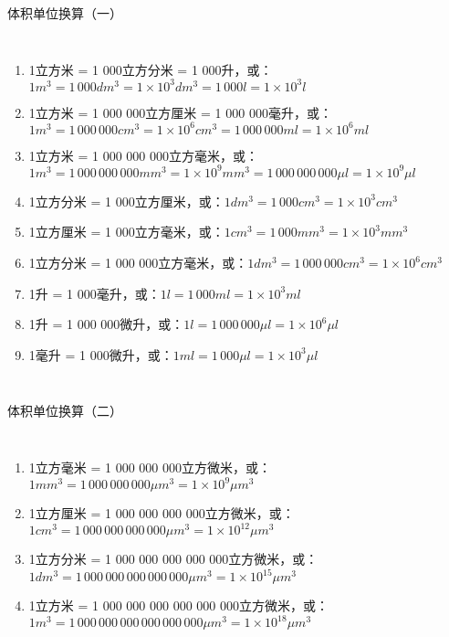 \documentclass[aspectratio=169]{ctexbeamer} %
\begin{document}
\begin{frame}[t]{体积单位换算（一）}
\begin{columns}
\begin{enumerate}[label={\Alph*.}]
\item 1立方米 = 1 000立方分米 = 1 000升，或：$1m^3 = 1 \, 000 dm^3 = 1 \times 10^3 dm^3 = 1 \, 000 l =  1 \times 10^3 l$ \pause
\item 1立方米 = 1 000 000立方厘米 = 1 000 000毫升，或：$1m^3 = 1 \, 000 \, 000 cm^3 = 1 \times 10^6 cm^3 = 1 \, 000 \, 000 ml = 1 \times 10^6 ml$ \pause
\item 1立方米 = 1 000 000 000立方毫米，或：$1m^3 = 1 \, 000 \, 000 \, 000 mm^3 = 1 \times 10^9 mm^3 = 1 \, 000 \, 000 \, 000 \mu l = 1 \times 10^9 \mu l$ \pause
\item 1立方分米 = 1 000立方厘米，或：$1dm^3 = 1 \, 000 cm^3 = 1 \times 10^3 cm^3$ \pause
\item 1立方厘米 = 1 000立方毫米，或：$1cm^3 = 1 \, 000 mm^3 = 1 \times 10^3 mm^3$ \pause
\item 1立方分米 = 1 000 000立方毫米，或：$1dm^3 = 1 \, 000 \, 000 cm^3 = 1 \times 10^6 cm^3$ \pause
\item 1升 = 1 000毫升，或：$1 l = 1 \, 000 ml = 1 \times 10^3 ml$ \pause
\item 1升 = 1 000 000微升，或：$1 l = 1 \,000 \, 000 \mu l = 1 \times 10^6 \mu l$ \pause
\item 1毫升 = 1 000微升，或：$1 ml = 1 \, 000 \mu l = 1 \times 10^3 \mu l$ \pause
\end{enumerate}
\end{columns}
\end{frame}

\begin{frame}[t]{体积单位换算（二）}
\begin{columns}
\begin{enumerate}[label={\Alph*.}]
\item 1立方毫米 = 1 000 000 000立方微米，或：$1mm^3 = 1 \, 000 \, 000 \, 000 \mu m^3 = 1 \times 10^{9} \mu m^3$ \pause
\item 1立方厘米 = 1 000 000 000 000立方微米，或：$1cm^3 = 1  \, 000 \, 000 \, 000 \, 000 \mu m^3 = 1 \times 10^{12} \mu m^3$ \pause
\item 1立方分米 = 1 000 000 000 000 000立方微米，或：$1dm^3 = 1 \, 000 \, 000 \, 000 \, 000 \, 000 \mu m^3 = 1 \times 10^{15} \mu m^3$ \pause
\item 1立方米 = 1 000 000 000 000 000 000立方微米，或：$1m^3 = 1 \, 000 \, 000 \, 000 \, 000 \, 000 \, 000 \mu m^3 = 1 \times 10^{18} \mu m^3$ \pause
\end{enumerate}
\end{columns}
\end{frame}
\end{document}
